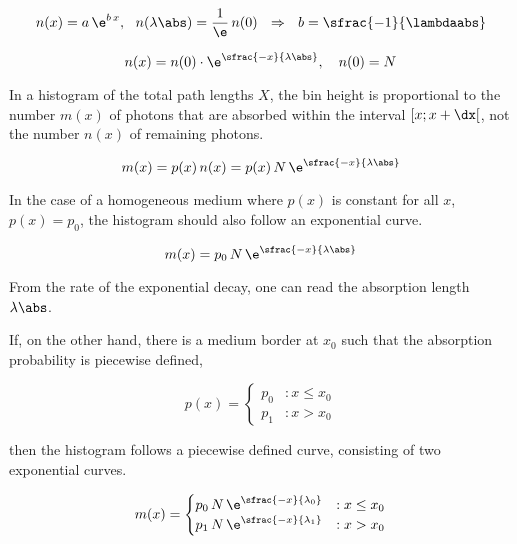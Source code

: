 $$
  n(x) = a\,\e^{b\,x}, \ \
  n(\lambda\abs) = \frac{1}{\e}\, n(0)
  \ \ \Rightarrow \ \
  b = \sfrac{-1}{\lambdaabs}
$$


$$
  n(x) = n(0) \cdot \e^{\sfrac{-x}{\lambda\abs}}, \ \ \ n(0) = N
$$

%

In a histogram of the total path lengths $X$, the bin height is proportional to the number $m(x)$ of photons that are absorbed within the interval $[x; x + \dx[$, not the number $n(x)$ of remaining photons.

$$
  m(x) = p(x)\,n(x) = p(x)\,N\,\e^{\sfrac{-x}{\lambda\abs}}
$$

In the case of a homogeneous medium where $p(x)$ is constant for all $x$, $p(x) = p_0$, the histogram should also follow an exponential curve.

$$
  m(x) = p_0\,N\,\e^{\sfrac{-x}{\lambda\abs}}
$$

From the rate of the exponential decay, one can read the absorption length $\lambda\abs$.

If, on the other hand, there is a medium border at $x_0$ such that the absorption probability is piecewise defined,

$$
  p(x) = \begin{cases}
    p_0 & : x \leq x_0 \\
    p_1 & : x > x_0
  \end{cases}
$$

then the histogram follows a piecewise defined curve, consisting of two exponential curves.

$$
  m(x) = \begin{cases}
    p_0\,N\,\e^{\sfrac{-x}{\lambda_0}} & : x \leq x_0 \\
    p_1\,N\,\e^{\sfrac{-x}{\lambda_1}} & : x > x_0
  \end{cases}
$$

